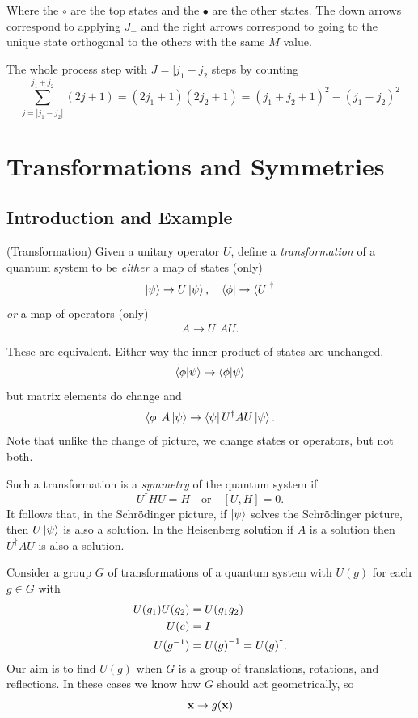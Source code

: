 \documentclass{article}
\begin{document}
\par
Where the $ \circ $ are the top states and the $ \bullet $ are the other states. The down arrows correspond to applying $ J_- $ and the right arrows correspond to going to the unique state orthogonal to the others with the same $ M $ value.\par
The whole process step with $ J = |j_1 -j_2 $ steps by counting
\[
	\sum_{j=|j_1-j_2|}^{j_1+j_2}(2j+1) = (2j_1+1)(2j_2+1) = (j_1+j_2+1)^2 - (j_1-j_2)^2
\]
\section{Transformations and Symmetries}
\subsection{Introduction and Example}
\begin{definition}
	(Transformation) Given a unitary operator $ U $, define a \textit{transformation} of a quantum system to be \textit{either} a map of states (only)
	\[
	  \ket\psi\to U\ket \psi, \quad \bra\phi \to \bra U^\dagger
	\]
	\textit{or} a map of operators (only) 
	\[
	  A \to U^\dagger AU.
	\]
\end{definition}
These are equivalent. Either way the inner product of states are unchanged. 
\[
	\bra {\phi} \ket {\psi} \to \bra {\phi}\ket {\psi}
\]
but matrix elements do change and
\[
	\bra{\phi} A \ket{\psi} \to \bra{\psi}U^\dagger A U \ket{\psi}.
\]
Note that unlike the change of picture, we change states or operators, but not both.\par
Such a transformation is a \textit{symmetry} of the quantum system if
\[
	U^\dagger H U = H\quad \text{or}\quad [U,H] = 0.
\]
It follows that, in the Schr\"odinger picture, if $ \ket\psi $ solves the Schr\"odinger picture, then $ U\ket \psi $ is also a solution. In the Heisenberg solution if $ A $ is a solution then $ U^\dagger AU $ is also a solution.\par
Consider a group $ G $ of transformations of a quantum system with $ U(g) $ for each $ g\in G $ with
\begin{align*}
	U(g_1)U(g_2) &= U(g_1g_2) \\
	U(e) &= I \\
	U({g}^{-1}) &= {U(g)}^{-1} = U(g)^\dagger.
\end{align*}
Our aim is to find $ U(g) $ when $ G $ is a group of translations, rotations, and reflections. In these cases we know how $ G $ should act geometrically, so
\[
  \mathbf{x} \to g(\mathbf{x})
\]
\end{document}
